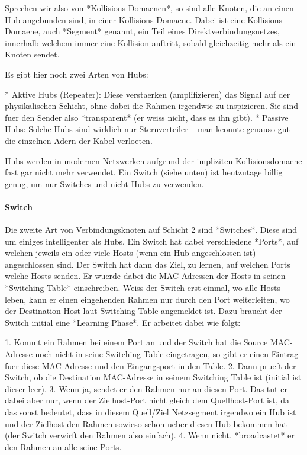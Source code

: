 Sprechen wir also von *Kollisions-Domaenen*, so sind alle Knoten, die an einen
Hub angebunden sind, in einer Kollisions-Domaene. Dabei ist eine
Kollisions-Domaene, auch *Segment* genannt, ein Teil eines
Direktverbindungsnetzes, innerhalb welchem immer eine Kollision auftritt, sobald
gleichzeitig mehr als ein Knoten sendet.

Es gibt hier noch zwei Arten von Hubs:

* Aktive Hubs (Repeater): Diese verstaerken (amplifizieren) das Signal auf der
  physikalischen Schicht, ohne dabei die Rahmen irgendwie zu inspizieren. Sie
  sind fuer den Sender also *transparent* (er weiss nicht, dass es ihn gibt).
* Passive Hubs: Solche Hubs sind wirklich nur Sternverteiler -- man keonnte
  genauso gut die einzelnen Adern der Kabel verloeten.

Hubs werden in modernen Netzwerken aufgrund der impliziten Kollisionsdomaene
fast gar nicht mehr verwendet. Ein Switch (siehe unten) ist heutzutage billig
genug, um nur Switches und nicht Hubs zu verwenden.

\paragraph{Switch} 

Die zweite Art von Verbindungsknoten auf Schicht 2 sind *Switches*. Diese sind
um einiges intelligenter als Hubs. Ein Switch hat dabei verschiedene *Ports*,
auf welchen jeweils ein oder viele Hosts (wenn ein Hub angeschlossen ist)
angeschlossen sind. Der Switch hat dann das Ziel, zu lernen, auf welchen Ports
welche Hosts senden. Er wuerde dabei die MAC-Adressen der Hosts in seinen
*Switching-Table* einschreiben. Weiss der Switch erst einmal, wo alle Hosts
leben, kann er einen eingehenden Rahmen nur durch den Port weiterleiten, wo der
Destination Host laut Switching Table angemeldet ist. Dazu braucht der Switch
initial eine *Learning Phase*. Er arbeitet dabei wie folgt:

1. Kommt ein Rahmen bei einem Port an und der Switch hat die Source MAC-Adresse
   noch nicht in seine Switching Table eingetragen, so gibt er einen Eintrag
   fuer diese MAC-Adresse und den Eingangsport in den Table.
2. Dann prueft der Switch, ob die Destination MAC-Adresse in seinem Switching
   Table ist (initial ist dieser leer).
3. Wenn ja, sendet er den Rahmen nur an diesen Port. Das tut er dabei aber nur,
   wenn der Zielhost-Port nicht gleich dem Quellhost-Port ist, da das sonst
   bedeutet, dass in diesem Quell/Ziel Netzsegment irgendwo ein Hub ist und der
   Zielhost den Rahmen sowieso schon ueber diesen Hub bekommen hat (der Switch
   verwirft den Rahmen also einfach).
4. Wenn nicht, *broadcastet* er den Rahmen an alle seine Ports.

